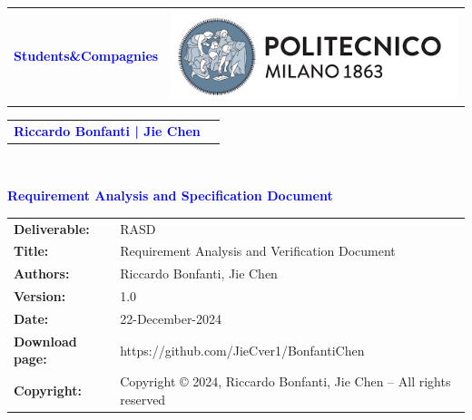 \documentclass[11pt,twoside]{article}
\begin{document}
\begin{titlepage}
\begin{table}[t!]
\centering
\begin{tabu} to \textwidth { X[1.3,r,p] X[1.7,l,p] }
\textcolor{Blue}{\textbf{\small{Students\&Compagnies}}} & \includegraphics[scale=0.5]{Images/PolimiLogo} \\
\end{tabu}
\begin{tabu} to \textwidth { X[1.3,r,p] X[1.7,l,p] }
    \textcolor{Blue}{\textbf{\small{Riccardo Bonfanti | Jie Chen}}} &\\
    \end{tabu}
\end{table}~\\ [7cm]

\begin{flushleft}
{\textcolor{Blue}{\textbf{\Huge{Requirement Analysis and Specification
        Document}}}} \\ [1cm]
\end{flushleft}
\end{titlepage}

\begin{table}[h!]
\begin{tabu} to \textwidth { X[0.3,r,p] X[0.7,l,p] }
\hline
\textbf{Deliverable:} & RASD\\
\textbf{Title:} & Requirement Analysis and Verification Document \\
\textbf{Authors:} & Riccardo Bonfanti, Jie Chen \\
\textbf{Version:} & 1.0 \\ 
\textbf{Date:} & 22-December-2024 \\
\textbf{Download page:} & https://github.com/JieCver1/BonfantiChen \\
\textbf{Copyright:} & Copyright © 2024, Riccardo Bonfanti, Jie Chen – All rights reserved \\
\hline
\end{tabu}
\end{table}

\setcounter{page}{2}
\end{document}
